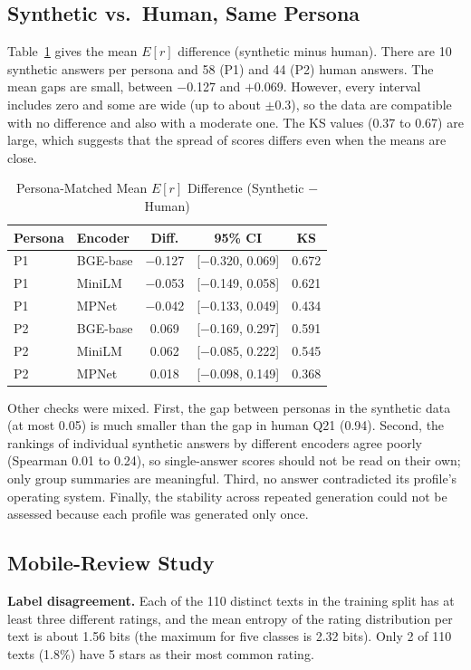 \documentclass[conference]{IEEEtran}
\begin{document}
\subsection{Synthetic vs.\ Human, Same Persona}
Table~\ref{tab:persona-match} gives the mean $E[r]$ difference (synthetic minus human). There are 10 synthetic answers per persona and 58 (P1) and 44 (P2) human answers. The mean gaps are small, between $-$0.127 and $+$0.069. However, every interval includes zero and some are wide (up to about $\pm$0.3), so the data are compatible with no difference and also with a moderate one. The KS values (0.37 to 0.67) are large, which suggests that the spread of scores differs even when the means are close.

\begin{table}[t]
\caption{Persona-Matched Mean $E[r]$ Difference (Synthetic $-$ Human)}
\label{tab:persona-match}
\centering
\small
\begin{tabular}{@{}llccc@{}}
\toprule
Persona & Encoder & Diff. & 95\% CI & KS \\
\midrule
P1 & BGE-base & $-$0.127 & [$-$0.320, 0.069] & 0.672 \\
P1 & MiniLM & $-$0.053 & [$-$0.149, 0.058] & 0.621 \\
P1 & MPNet & $-$0.042 & [$-$0.133, 0.049] & 0.434 \\
P2 & BGE-base & 0.069 & [$-$0.169, 0.297] & 0.591 \\
P2 & MiniLM & 0.062 & [$-$0.085, 0.222] & 0.545 \\
P2 & MPNet & 0.018 & [$-$0.098, 0.149] & 0.368 \\
\bottomrule
\end{tabular}
\end{table}

Other checks were mixed. First, the gap between personas in the synthetic data (at most 0.05) is much smaller than the gap in human Q21 (0.94). Second, the rankings of individual synthetic answers by different encoders agree poorly (Spearman 0.01 to 0.24), so single-answer scores should not be read on their own; only group summaries are meaningful. Third, no answer contradicted its profile's operating system. Finally, the stability across repeated generation could not be assessed because each profile was generated only once.

\subsection{Mobile-Review Study}
\textbf{Label disagreement.} Each of the 110 distinct texts in the training split has at least three different ratings, and the mean entropy of the rating distribution per text is about 1.56 bits (the maximum for five classes is 2.32 bits). Only 2 of 110 texts (1.8\%) have 5 stars as their most common rating.
\end{document}
